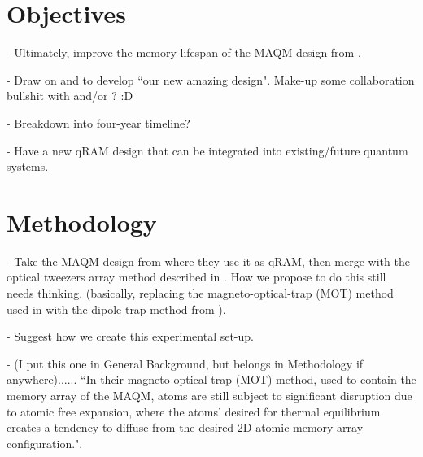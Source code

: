 \documentclass[journal, a4paper]{IEEEtran}
\begin{document}
{%

\section{Objectives}

\vspace{0.2cm}

- Ultimately, improve the memory lifespan of the MAQM design from \cite{MainMAQM}. 

- Draw on \cite{MainMAQM} and \cite{OptTweezer} to develop ``our new amazing design". Make-up some collaboration bullshit with \cite{MainMAQM} and/or \cite{OptTweezer}? :D

- Breakdown into four-year timeline?

- Have a new qRAM design that can be integrated into existing/future quantum systems.


\section{Methodology}

\vspace{0.2cm}

- Take the MAQM design from \cite{MainMAQM} where they use it as qRAM, then merge with the optical tweezers array method described in \cite{OptTweezer}. How we propose to do this still needs thinking. (basically, replacing the magneto-optical-trap (MOT) method used in \cite{MainMAQM} with the dipole trap method from \cite{OptTweezer}).

- Suggest how we create this experimental set-up.

- (I put this one in General Background, but belongs in Methodology if anywhere)...... ``In their magneto-optical-trap (MOT) method, used to contain the memory array of the MAQM, atoms are still subject to significant disruption due to atomic free expansion, where the atoms' desired for thermal equilibrium creates a tendency to diffuse from the desired 2D atomic memory array configuration.".


\vfill



\vspace{-0.6cm}

}
\end{document}
